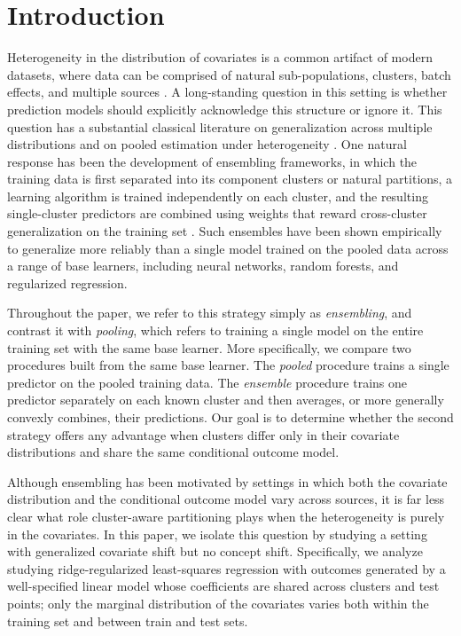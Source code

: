 \documentclass{article}
\theoremstyle{plain}
\theoremstyle{remark}
\begin{document}
\section{Introduction}
\label{sec:intro}
\par Heterogeneity in the distribution of covariates is a common artifact of modern datasets, where data can be comprised of natural sub-populations, clusters, batch effects, and multiple sources \citep{goh2017batch, chauhan2010data}. A long-standing question in this setting is whether prediction models should explicitly acknowledge this structure or ignore it. This question has a substantial classical literature on generalization across multiple distributions \citep{crammer2008learning, bendavid2010theory, mansour2009domain} and on pooled estimation under heterogeneity \citep{meinshausen2015maximin, li2022transfer}. One natural response has been the development of ensembling frameworks, in which the training data is first separated into its component clusters or natural partitions, a learning algorithm is trained independently on each cluster, and the resulting single-cluster predictors are combined using weights that reward cross-cluster generalization on the training set \citep{Patil2018, deodhar2007, Trivedi2015, Ramchandran2020, ramchandran2021ensembling,Guan2019a}. Such ensembles have been shown empirically to generalize more reliably than a single model trained on the pooled data across a range of base learners, including neural networks, random forests, and regularized regression. 

Throughout the paper, we refer to this strategy simply as \emph{ensembling}, and contrast it with \emph{pooling}, which refers to training a single model on the entire training set with the same base learner. More specifically, we compare two procedures built from the same base learner. The \emph{pooled} procedure trains a single predictor on the pooled training data. The \emph{ensemble} procedure trains one predictor separately on each known cluster and then averages, or more generally convexly combines, their predictions. Our goal is to determine whether the second strategy offers any advantage when clusters differ only in their covariate distributions and share the same conditional outcome model.

\par Although ensembling has been motivated by settings in which both the covariate distribution and the conditional outcome model vary across sources, it is far less clear what role cluster-aware partitioning plays when the heterogeneity is purely in the covariates. In this paper, we isolate this question by studying a setting with generalized covariate shift but no concept shift. Specifically, we analyze studying ridge-regularized least-squares regression with outcomes generated by a well-specified linear model whose coefficients are shared across clusters and test points; only the marginal distribution of the covariates varies both within the training set and between train and test sets.
\end{document}
